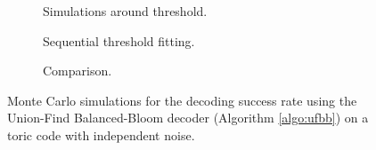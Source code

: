 \begin{figure}[htbp]
  \centering
  \begin{subfigure}[b]{0.49\textwidth}
    \begin{adjustbox}{Clip=0 1em 0 0}
      
    \end{adjustbox}
    \caption{Simulations around threshold.}
  \end{subfigure}
  \begin{subfigure}[b]{0.49\textwidth}
    \begin{adjustbox}{Clip=0 1em 0 0}
      
    \end{adjustbox}
    \caption{Sequential threshold fitting.}
  \end{subfigure}
  \begin{subfigure}[b]{\textwidth}
    \begin{adjustbox}{Clip=0 1em 0 0}
    
    \end{adjustbox}
    \caption{Comparison.}
  \end{subfigure}
  \caption{Monte Carlo simulations for the decoding success rate using the Union-Find Balanced-Bloom decoder (Algorithm \ref{algo:ufbb}) on a toric code with independent noise.}
  \label{fig:thres_ufbb_toric_2d}
\end{figure}

